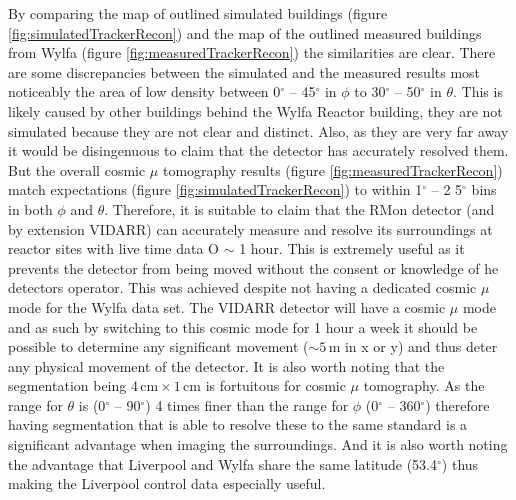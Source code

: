 By comparing the map of outlined simulated buildings (figure \ref{fig:simulatedTrackerRecon}) and the map of the outlined measured buildings from Wylfa (figure \ref{fig:measuredTrackerRecon}) the similarities are clear. There are some discrepancies between the simulated and the measured results most noticeably the area of low density between 0$^\circ$ -- 45$^\circ$ in $\phi$ to 30$^\circ$ -- 50$^\circ$ in $\theta$. This is likely caused by other buildings behind the Wylfa Reactor building, they are not simulated because they are not clear and distinct. Also, as they are very far away it would be disingenuous to claim that the detector has accurately resolved them. But the overall cosmic $\mu$ tomography results (figure \ref{fig:measuredTrackerRecon}) match expectations (figure \ref{fig:simulatedTrackerRecon}) to within 1$^\circ$ -- 2 5$^\circ$ bins in both $\phi$ and $\theta$. Therefore, it is suitable to claim that the RMon detector (and by extension VIDARR) can accurately measure and resolve its surroundings at reactor sites with live time data O $\sim$ 1 hour. This is extremely useful as it prevents the detector from being moved without the consent or knowledge of he detectors operator. This was achieved despite not having a dedicated cosmic $\mu$ mode for the Wylfa data set. The VIDARR detector will have a cosmic $\mu$ mode and as such by switching to this cosmic mode for 1 hour a week it should be possible to determine any significant movement ($\sim 5\,\textrm{m}$ in x or y) and thus deter any physical movement of the detector. It is also worth noting that the segmentation being $4\,\textrm{cm} \times 1\,\textrm{cm}$ is fortuitous for cosmic $\mu$ tomography. As the range for $\theta$ is (0$^\circ$ -- 90$^\circ$) 4 times finer than the range for $\phi$ (0$^\circ$ -- 360$^\circ$) therefore having segmentation that is able to resolve these to the same standard is a significant advantage when imaging the surroundings. And it is also worth noting the advantage that Liverpool and Wylfa share the same latitude (53.4$^\circ$) thus making the Liverpool control data especially useful. %

\clearpage
